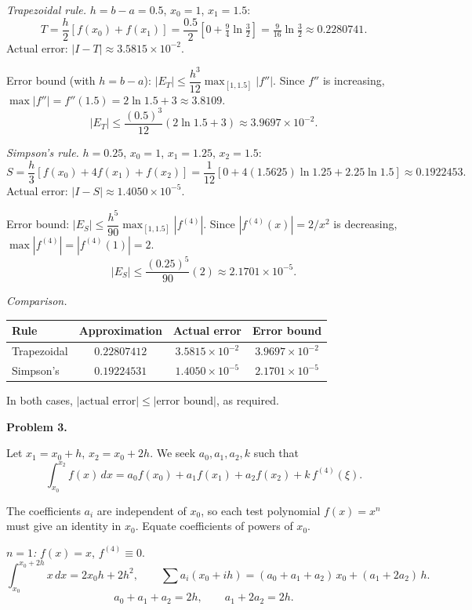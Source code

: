 \documentclass[12pt,letterpaper]{article}
\begin{document}
\textit{Trapezoidal rule.} $h = b-a = 0.5$, $x_0 = 1$, $x_1 = 1.5$:
\[
T = \frac{h}{2}[f(x_0) + f(x_1)] = \frac{0.5}{2}\!\left[0 + \tfrac{9}{4}\ln\!\tfrac{3}{2}\right] = \tfrac{9}{16}\ln\!\tfrac{3}{2} \approx 0.2280741.
\]
Actual error: $|I - T| \approx 3.5815 \times 10^{-2}$.

Error bound (with $h = b-a$): $|E_T| \le \dfrac{h^3}{12}\max_{[1,1.5]}|f''|$. Since $f''$ is increasing,
$\max|f''| = f''(1.5) = 2\ln 1.5 + 3 \approx 3.8109$.
\[
|E_T| \le \frac{(0.5)^3}{12}(2\ln 1.5 + 3) \approx 3.9697 \times 10^{-2}.
\]

\textit{Simpson's rule.} $h = 0.25$, $x_0 = 1$, $x_1 = 1.25$, $x_2 = 1.5$:
\[
S = \frac{h}{3}[f(x_0) + 4f(x_1) + f(x_2)]
= \frac{1}{12}\!\left[0 + 4(1.5625)\ln 1.25 + 2.25\ln 1.5\right] \approx 0.1922453.
\]
Actual error: $|I - S| \approx 1.4050 \times 10^{-5}$.

Error bound: $|E_S| \le \dfrac{h^5}{90}\max_{[1,1.5]}|f^{(4)}|$. Since $|f^{(4)}(x)| = 2/x^2$ is decreasing,
$\max|f^{(4)}| = |f^{(4)}(1)| = 2$.
\[
|E_S| \le \frac{(0.25)^5}{90}(2) \approx 2.1701 \times 10^{-5}.
\]

\textit{Comparison.}
\begin{center}
\begin{tabular}{lccc}
\toprule
Rule & Approximation & Actual error & Error bound \\
\midrule
Trapezoidal & $0.22807412$ & $3.5815 \times 10^{-2}$ & $3.9697 \times 10^{-2}$ \\
Simpson's   & $0.19224531$ & $1.4050 \times 10^{-5}$ & $2.1701 \times 10^{-5}$ \\
\bottomrule
\end{tabular}
\end{center}

In both cases, $|\text{actual error}| \le |\text{error bound}|$, as required.



\textbf{Problem 3.}

Let $x_1 = x_0 + h$, $x_2 = x_0 + 2h$. We seek $a_0, a_1, a_2, k$ such that
\[
\int_{x_0}^{x_2} f(x)\,dx = a_0 f(x_0) + a_1 f(x_1) + a_2 f(x_2) + k\,f^{(4)}(\xi).
\]

The coefficients $a_i$ are independent of $x_0$, so each test polynomial $f(x) = x^n$ must give an identity in $x_0$. Equate coefficients of powers of $x_0$.

\textit{$n = 1$:} $f(x) = x$, $f^{(4)} \equiv 0$.
\[
\int_{x_0}^{x_0+2h} x\,dx = 2 x_0 h + 2h^2,
\qquad
\sum a_i (x_0 + ih) = (a_0+a_1+a_2)\,x_0 + (a_1 + 2a_2)\,h.
\]
\[
a_0 + a_1 + a_2 = 2h, \qquad a_1 + 2a_2 = 2h. \tag{I, II}
\]
\end{document}
